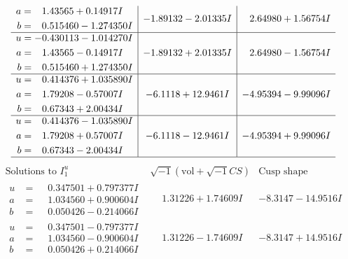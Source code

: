 \documentclass[1p]{elsarticle_modified}
\theoremstyle{definition}
\newcommand{\I}{\sqrt{-1}}
\begin{document}
$$\begin{array}{c|c|c}
\begin{aligned}
a &= \phantom{-}1.43565 + 0.14917 I \\
b &= \phantom{-}0.515460 - 1.274350 I\end{aligned}
 & -1.89132 - 2.01335 I & \phantom{-}2.64980 + 1.56754 I \\ \hline\begin{aligned}
u &= -0.430113 - 1.014270 I \\
a &= \phantom{-}1.43565 - 0.14917 I \\
b &= \phantom{-}0.515460 + 1.274350 I\end{aligned}
 & -1.89132 + 2.01335 I & \phantom{-}2.64980 - 1.56754 I \\ \hline\begin{aligned}
u &= \phantom{-}0.414376 + 1.035890 I \\
a &= \phantom{-}1.79208 - 0.57007 I \\
b &= \phantom{-}0.67343 + 2.00434 I\end{aligned}
 & -6.1118 + 12.9461 I & -4.95394 - 9.99096 I \\ \hline\begin{aligned}
u &= \phantom{-}0.414376 - 1.035890 I \\
a &= \phantom{-}1.79208 + 0.57007 I \\
b &= \phantom{-}0.67343 - 2.00434 I\end{aligned}
 & -6.1118 - 12.9461 I & -4.95394 + 9.99096 I\\
 \hline 
 \end{array}$$\newpage$$\begin{array}{c|c|c}  
\text{Solutions to }I^u_{1}& \I (\text{vol} + \sqrt{-1}CS) & \text{Cusp shape}\\
 \hline 
\begin{aligned}
u &= \phantom{-}0.347501 + 0.797377 I \\
a &= \phantom{-}1.034560 + 0.900604 I \\
b &= \phantom{-}0.050426 - 0.214066 I\end{aligned}
 & \phantom{-}1.31226 + 1.74609 I & -8.3147 - 14.9516 I \\ \hline\begin{aligned}
u &= \phantom{-}0.347501 - 0.797377 I \\
a &= \phantom{-}1.034560 - 0.900604 I \\
b &= \phantom{-}0.050426 + 0.214066 I\end{aligned}
 & \phantom{-}1.31226 - 1.74609 I & -8.3147 + 14.9516 I \\ \hline\begin{aligned}

\end{aligned}
\end{array}$$
\end{document}
